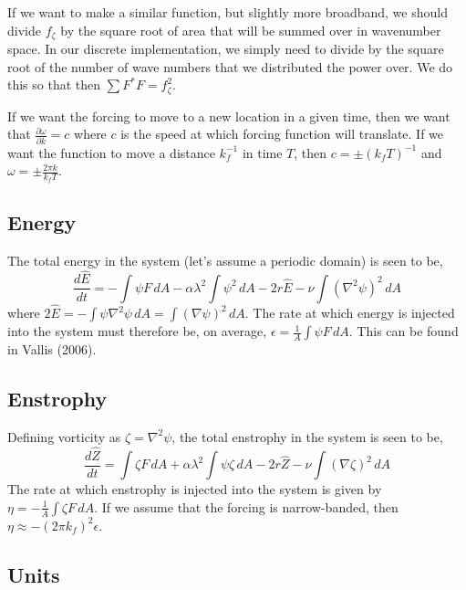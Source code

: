 \documentclass[11pt]{article}
\begin{document}
If we want to make a similar function, but slightly more broadband, we should divide $f_\zeta$ by the square root of area that will be summed over in wavenumber space. In our discrete implementation, we simply need to divide by the square root of the number of wave numbers that we distributed the power over. We do this so that then $\sum F^\ast F = f_\zeta^2$.

If we want the forcing to move to a new location in a given time, then we want that $\frac{\partial \omega}{\partial k}=c$ where $c$ is the speed at which forcing function will translate. If we want the function to move a distance $k_f^{-1}$ in time $T$, then $c=\pm\left( k_f T \right)^{-1}$ and $\omega = \pm \frac{2\pi k}{k_f T }$.

%
\subsection{Energy}
%

The total energy in the system (let's assume a periodic domain) is seen to be,
\begin{equation}
\frac{d \hat{E}}{d t} = - \int \psi F \, dA - \alpha \lambda^2 \int \psi^2 \, dA - 2 r \hat{E} - \nu \int \left( \nabla^2 \psi \right)^2 \, dA
\end{equation}
where $2 \hat{E}= - \int \psi \nabla^2 \psi \, dA =  \int \left( \nabla \psi \right)^2 \, dA$. The rate at which energy is injected into the system must therefore be, on average, $\epsilon=\frac{1}{A} \int \psi F \, dA$. This can be found in Vallis (2006).

%
\subsection{Enstrophy}
%

Defining vorticity as $\zeta = \nabla^2 \psi$, the total enstrophy in the system is seen to be,
\begin{equation}
\frac{d \hat{Z}}{d t} = \int \zeta F \, dA + \alpha \lambda^2 \int \psi \zeta \, dA - 2 r \hat{Z} - \nu \int \left( \nabla \zeta \right)^2 \, dA
\end{equation}
The rate at which enstrophy is injected into the system is given by $\eta=-\frac{1}{A} \int \zeta F \, dA$. If we assume that the forcing is narrow-banded, then $\eta \approx - (2\pi k_f)^2 \epsilon$.

%
\subsection{Units}
%
\end{document}
